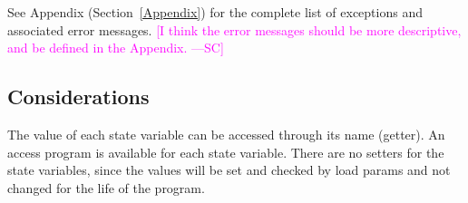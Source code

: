 \documentclass[12pt, titlepage]{article}
\newcommand{\authornote}[3]{\textcolor{#1}{[#3 ---#2]}}
\newcommand{\authornote}[3]{}
\newcommand{\sam}[1]{\authornote{magenta}{SC}{#1}}
\begin{document}
See Appendix (Section~\ref{Appendix}) for the complete list of exceptions and 
associated error messages. \sam{I think the error messages should be more 
descriptive, and be defined in the Appendix.}

\subsection{Considerations}

The value of each state variable can be accessed through its name (getter).  An
access program is available for each state variable.  There are no setters for
the state variables, since the values will be set and checked by load params and
not changed for the life of the program.

\newpage








\end{document}
